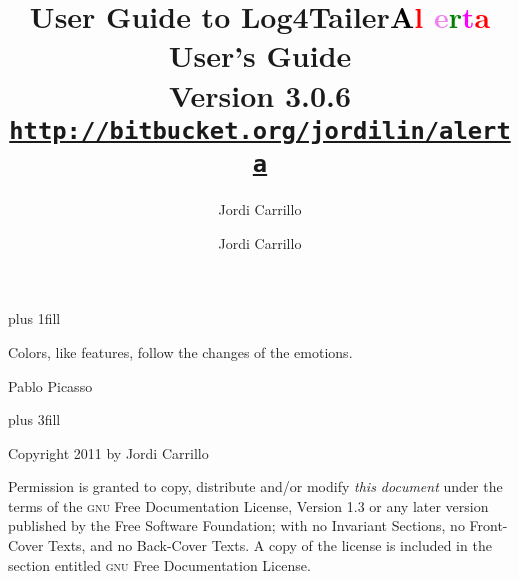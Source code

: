 \documentclass[a4paper, twoside]{article}
\author{Jordi Carrillo}
\title{User Guide to Log4Tailer}
\newcommand{\logftailer}{\textbf{\textcolor{black}{A}\textcolor{red}{l}%
\textcolor{Violet}{e}\textcolor{green}{r}\textcolor{magenta}{t}\textcolor{red}{a}}}
\newcommand{\contentsrule}[1]{{\color{blue}\sectionrule{3ex}{3pt}{-2ex}{1pt}{#1}}}
\begin{document}


\newpage
\pagecolor{white}

\vbox{}
\vskip0pt plus 1fill
\epigraph{Colors, like features, follow the changes of the emotions.}{Pablo Picasso}
 \vskip0pt plus 3fill

\noindent
Copyright 2011 by Jordi Carrillo

\medskip
\noindent 
Permission is granted to copy, distribute and/or modify \emph{this document}
under the terms of the \textsc{gnu} Free Documentation License, Version 1.3
or any later version published by the Free Software Foundation;
with no Invariant Sections, no Front-Cover Texts, and no Back-Cover Texts.
A copy of the license is included in the section entitled \textsc{gnu}
Free Documentation License.


\vbox{}
\newpage


\title{{\bfseries \logftailer{} User's Guide}\\[1mm]
  \large Version 3.0.6\\[1mm]
\large\href{http://bitbucket.org/jordilin/alerta}{\texttt{http://bitbucket.org/jordilin/alerta}}}
\author{Jordi Carrillo}

\maketitle

\tableofcontents

\newpage




%

\end{document}
